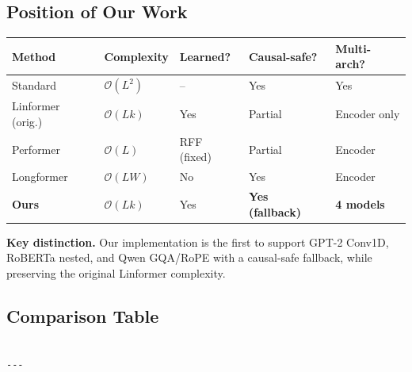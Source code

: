 \subsection{Position of Our Work}

\begin{table}[H]
\centering
\small
\begin{tabular}{lllll}
\toprule
\textbf{Method} & \textbf{Complexity} & \textbf{Learned?} & \textbf{Causal-safe?} & \textbf{Multi-arch?} \\
\midrule
Standard & $\mathcal{O}(L^2)$ & -- & Yes & Yes \\
Linformer (orig.) & $\mathcal{O}(L k)$ & Yes & Partial & Encoder only \\
Performer & $\mathcal{O}(L)$ & RFF (fixed) & Partial & Encoder \\
Longformer & $\mathcal{O}(L W)$ & No & Yes & Encoder \\
\textbf{Ours} & $\mathcal{O}(L k)$ & Yes & \textbf{Yes (fallback)} & \textbf{4 models} \\
\bottomrule
\end{tabular}
\end{table}

\textbf{Key distinction.} Our implementation is the first to support GPT-2 
Conv1D, RoBERTa nested, and Qwen GQA/RoPE with a causal-safe fallback, 
while preserving the original Linformer complexity.



\subsection{Comparison Table}

\begin{lstlisting}

---
\end{lstlisting}